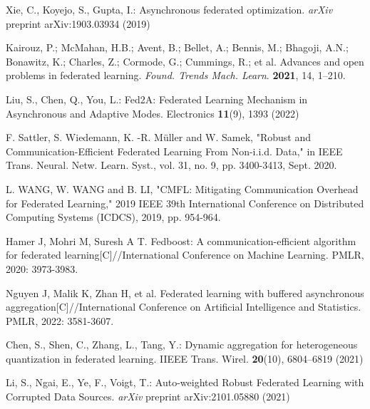 \documentclass[twoside,twocolumn]{article}
\begin{document}
\begin{spacing}{1.0}
\begin{thebibliography}{00}
  Xie, C., Koyejo, S., Gupta, I.: Asynchronous federated optimization. \emph{arXiv} preprint arXiv:1903.03934 (2019)
 \vspace{-0.3cm}
 
  Kairouz, P.; McMahan, H.B.; Avent, B.; Bellet, A.; Bennis, M.; Bhagoji, A.N.; Bonawitz, K.; Charles, Z.; Cormode, G.; Cummings, R.; et al. Advances and open problems in federated learning. \emph{Found. Trends Mach. Learn}. \textbf{2021}, 14, 1–210.
 \vspace{-0.3cm}

   Liu, S., Chen, Q., You, L.: Fed2A: Federated Learning Mechanism in Asynchronous and Adaptive Modes. Electronics \textbf{11}(9), 1393 (2022)
 \vspace{-0.3cm}
 
  F. Sattler, S. Wiedemann, K. -R. Müller and W. Samek, "Robust and Communication-Efficient Federated Learning From Non-i.i.d. Data," in IEEE Trans. Neural. Netw. Learn. Syst., vol. 31, no. 9, pp. 3400-3413, Sept. 2020.
 \vspace{-0.3cm}
 
    L. WANG, W. WANG and B. LI, "CMFL: Mitigating Communication Overhead for Federated Learning," 2019 IEEE 39th International Conference on Distributed Computing Systems (ICDCS), 2019, pp. 954-964.
 \vspace{-0.3cm}
 
    Hamer J, Mohri M, Suresh A T. Fedboost: A communication-efficient algorithm for federated learning[C]//International Conference on Machine Learning. PMLR, 2020: 3973-3983.
 \vspace{-0.3cm}
 
    Nguyen J, Malik K, Zhan H, et al. Federated learning with buffered asynchronous aggregation[C]//International Conference on Artificial Intelligence and Statistics. PMLR, 2022: 3581-3607.
 \vspace{-0.7cm}
 
  Chen, S., Shen, C., Zhang, L., Tang, Y.: Dynamic aggregation for heterogeneous quantization in federated learning. IIEEE Trans. Wirel. \textbf{20}(10), 6804–6819 (2021)
 \vspace{-0.3cm}
 
    Li, S., Ngai, E., Ye, F., Voigt, T.: Auto-weighted Robust Federated Learning with Corrupted Data Sources. \emph{arXiv} preprint arXiv:2101.05880 (2021)
 \vspace{-0.7cm}
 

\end{thebibliography}
\end{spacing}
\end{document}
